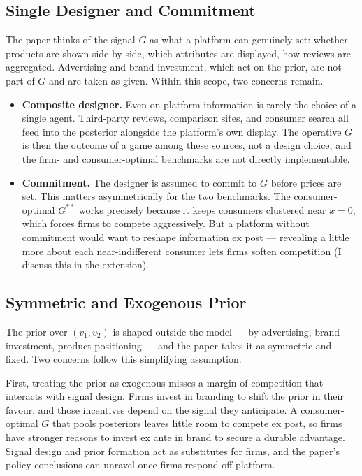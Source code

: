 \documentclass[12pt, a4paper]{article}
\begin{document}
\subsection{Single Designer and Commitment}

The paper thinks of the signal $G$ as what a platform can genuinely set: whether products are shown side by side, which attributes are displayed, how reviews are aggregated. Advertising and brand investment, which act on the prior, are not part of $G$ and are taken as given. Within this scope, two concerns remain.

\begin{itemize}[nosep]
    \item \textbf{Composite designer.} Even on-platform information is rarely the choice of a single agent. Third-party reviews, comparison sites, and consumer search all feed into the posterior alongside the platform's own display. The operative $G$ is then the outcome of a game among these sources, not a design choice, and the firm- and consumer-optimal benchmarks are not directly implementable.
    \item \textbf{Commitment.} The designer is assumed to commit to $G$ before prices are set. This matters asymmetrically for the two benchmarks. The consumer-optimal $G^{**}$ works precisely because it keeps consumers clustered near $x = 0$, which forces firms to compete aggressively. But a platform without commitment would want to reshape information ex post --- revealing a little more about each near-indifferent consumer lets firms soften competition (I discuss this in the extension).
\end{itemize}

\subsection{Symmetric and Exogenous Prior}

The prior over $(v_1, v_2)$ is shaped outside the model --- by advertising, brand investment, product positioning --- and the paper takes it as symmetric and fixed. Two concerns follow this simplifying assumption.

First, treating the prior as exogenous misses a margin of competition that interacts with signal design. Firms invest in branding to shift the prior in their favour, and those incentives depend on the signal they anticipate. A consumer-optimal $G$ that pools posteriors leaves little room to compete ex post, so firms have stronger reasons to invest ex ante in brand to secure a durable advantage. Signal design and prior formation act as substitutes for firms, and the paper's policy conclusions can unravel once firms respond off-platform.
\end{document}
